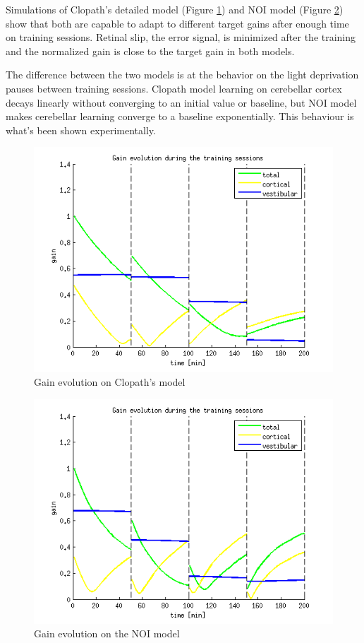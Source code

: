 \documentclass[12pt, a4paper,twoside]{tesi_upf}
\begin{document}
Simulations of Clopath's detailed model (Figure \ref {fig:clopathgain}) and NOI model (Figure \ref {fig:longnoigain}) show that both are capable to adapt to different target gains after enough time on training sessions. Retinal slip, the error signal, is minimized after the training and the normalized gain is close to the target gain in both models.

The difference between the two models is at the behavior on the light deprivation pauses between training sessions. Clopath model learning on cerebellar cortex decays linearly without converging to an initial value or baseline, but NOI model makes cerebellar learning converge to a baseline exponentially. This behaviour is what's been shown experimentally.

\begin{figure}
  \centering
  \includegraphics[scale=0.8]{images/clopath_11.png}
  \caption[Gain evolution on Clopath's model]{Gain evolution on Clopath's model}
  \label{fig:clopathgain}
\end{figure}

\begin{figure}
  \centering
  \includegraphics[scale=0.8]{images/longnoi_12.png}
  \caption[Gain evolution on the NOI model]{Gain evolution on the NOI model}
  \label{fig:longnoigain}
\end{figure}
\end{document}
